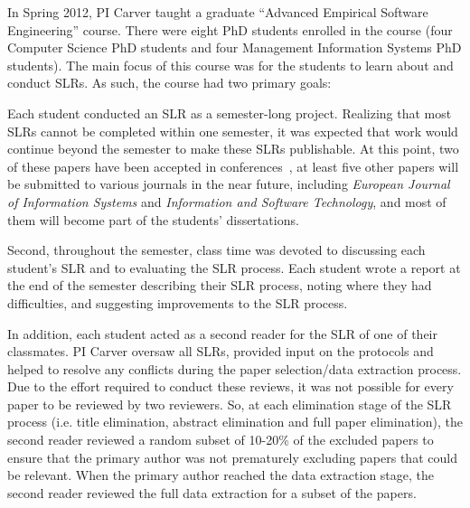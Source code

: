 In Spring 2012, PI Carver taught a graduate ``Advanced Empirical Software Engineering'' course. There were eight PhD students enrolled in the course (four Computer Science PhD students and four Management Information Systems PhD students). The main focus of this course was for the students to learn about and conduct SLRs. As such, the course had two primary goals:
\vspace*{-4pt}
\begin{enumerate*}
	\item Each student conducted an SLR as a semester-long  project. Realizing that most SLRs cannot be completed within one semester, it was expected that work would continue beyond the semester to make these SLRs publishable. At this point, two of these papers have been accepted in conferences~\cite{Thompson_et_al_2012,Kakar_Carver_2012}, at least five other papers will be submitted to various journals in the near future, including \emph{European Journal of Information Systems} and \emph{Information and Software Technology}, and most of them will become part of the students' dissertations.
	\item Second, throughout the semester, class time was devoted to discussing each student's SLR and to evaluating the SLR process. Each student wrote a report at the end of the semester describing their SLR process, noting where they had difficulties, and suggesting improvements to the SLR process.
\end{enumerate*}
\vspace*{-4pt}

In addition, each student acted as a second reader for the SLR of one of their classmates. PI Carver oversaw all SLRs, provided input on the protocols and helped to resolve any conflicts during the paper selection/data extraction process. Due to the effort required to conduct these reviews, it was not possible for every paper to be reviewed by two reviewers. So, at each elimination stage of the SLR process (i.e. title elimination, abstract elimination and full paper elimination), the second reader reviewed a random subset of 10-20\% of the excluded papers to ensure that the primary author was not prematurely excluding papers that could be relevant. When the primary author reached the data extraction stage, the second reader reviewed the full data extraction for a subset of the papers.

